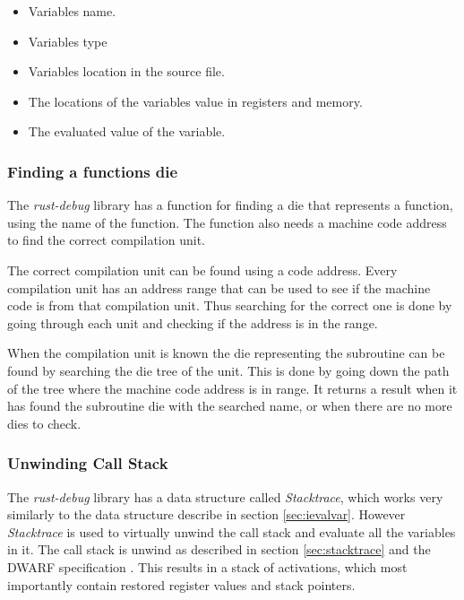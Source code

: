 \begin{itemize}
  \item Variables name.
  \item Variables type
  \item Variables location in the source file.
  \item The locations of the variables value in registers and memory.
  \item The evaluated value of the variable.
\end{itemize}


\subsubsection{Finding a functions \gls{die}} \label{sec:funcdie}
The \emph{rust-debug} library has a function for finding a \gls{die} that represents a function, using the name of the function.
The function also needs a machine code address to find the correct compilation unit.


The correct compilation unit can be found using a code address.
Every compilation unit has an address range that can be used to see if the machine code is from that compilation unit.
Thus searching for the correct one is done by going through each unit and checking if the address is in the range.


When the compilation unit is known the \gls{die} representing the subroutine can be found by searching the \gls{die} tree of the unit.
This is done by going down the path of the tree where the machine code address is in range.
It returns a result when it has found the subroutine \gls{die} with the searched name, or when there are no more \glspl{die} to check.


\subsubsection{Unwinding Call Stack}
The \emph{rust-debug} library has a data structure called \emph{Stacktrace}, which works very similarly to the data structure describe in section \ref{sec:ievalvar}.
However \emph{Stacktrace} is used to virtually unwind the call stack and evaluate all the variables in it.
The call stack is unwind as described in section \ref{sec:stacktrace} and the \gls{DWARF} specification \cite{dwarf}.
This results in a stack of activations, which most importantly contain restored register values and stack pointers.



